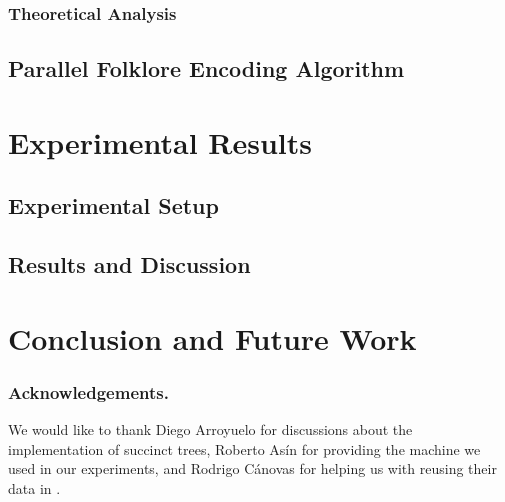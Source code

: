 \documentclass[runningheads]{llncs}
\begin{document}
\subsubsection{Theoretical Analysis}
\label{subsec:theoreticalAnalysis}


%

\subsection{Parallel Folklore Encoding Algorithm}
\label{subsec:parenthesesAlgorithm}


\section{Experimental Results}
\label{sec:exps}


\subsection{Experimental Setup}
\label{subsec:experimentalSetup}


\subsection{Results and Discussion}
\label{subsec:resultsDiscussion}



\section{Conclusion and Future Work}
\label{sec:conclusion}


\subsubsection*{Acknowledgements.}

We would like to thank Diego Arroyuelo for discussions about the
implementation of succinct trees, Roberto As\'{i}n for providing the machine
we used in our experiments, and Rodrigo C\'{a}novas
for helping us with reusing their data in
\cite{Navarro:2014:FFS:2620785.2601073}.



\end{document}
